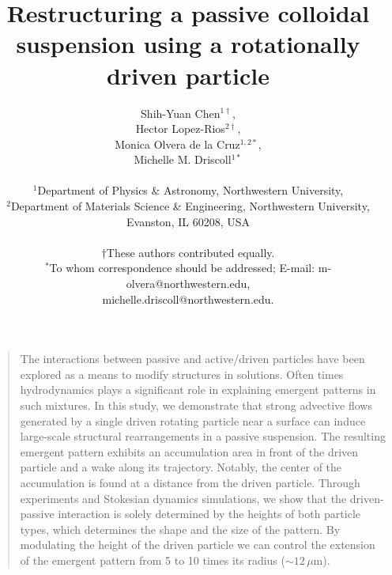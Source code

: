 \documentclass[12pt]{article}
\title{Restructuring a passive colloidal suspension using a rotationally driven particle}
\author
{Shih-Yuan Chen$^{1\dagger}$, \\
Hector Lopez-Rios$^{2\dagger}$,\\
Monica Olvera de la Cruz$^{1,2\ast}$,\\
Michelle M. Driscoll$^{1\ast}$\\
\\
\normalsize{$^{1}$Department of Physics \& Astronomy, Northwestern University,}\\
\normalsize{$^{2}$Department of Materials Science \& Engineering, Northwestern University,}\\
\normalsize{Evanston, IL 60208, USA}\\
\\
\normalsize{$\dagger$These authors contributed equally.}\\
\normalsize{$^\ast$To whom correspondence should be addressed; E-mail:  m-olvera@northwestern.edu,}\\
\normalsize{michelle.driscoll@northwestern.edu.}
}
\date{}
\newenvironment{sciabstract}{%
\begin{quote} \bf}
{\end{quote}}
\begin{document}
 
\baselineskip24pt
\maketitle 


\begin{sciabstract} %

The interactions between passive and active/driven particles have been explored as a means to modify structures in solutions. Often times hydrodynamics plays a significant role in explaining emergent patterns in such mixtures. In this study, we demonstrate that strong advective flows generated by a single driven rotating particle near a surface can induce large-scale structural rearrangements in a passive suspension. The resulting emergent pattern exhibits an accumulation area in front of the driven particle and a wake along its trajectory. Notably, the center of the accumulation is found at a distance from the driven particle. Through experiments and Stokesian dynamics simulations, we show that the driven-passive interaction is solely determined by the heights of both particle types, which determines the shape and the size of the pattern. By modulating the height of the driven particle we can control the extension of the emergent pattern from 5 to 10 times its radius ($\sim 12 \, \mu \mathrm{m}$).


\end{sciabstract}
\end{document}
